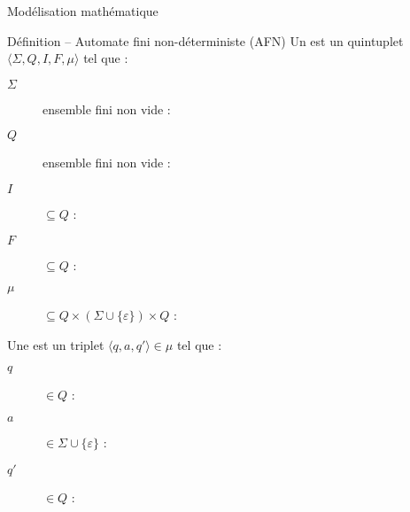 
\begingroup

\begin{frame}{Modélisation mathématique}
  \vspace{-4mm}
  \begin{block}{Définition -- Automate fini non-déterministe (AFN)}
    \vspace{3mm}
    Un  est un quintuplet \alert{$\langle \Sigma, Q, I, F, \mu \rangle$} tel que :
    \begin{description}
    \item[\alert{$\Sigma$}] ensemble fini non vide : 
    \item[\alert{$Q$}] ensemble fini non vide : 
    \item[\alert{$I$}] $\subseteq Q$ : 
    \item[\alert{$F$}] $\subseteq Q$ : 
    \item[\alert{$\mu$}] $\subseteq  Q \times (\Sigma \cup \{\varepsilon\}) \times Q$ : 
    \end{description}

    \vspace{3mm}
    Une  est un triplet \alert{$\langle q, a, q' \rangle \in \mu$} tel que :
    \begin{description}
    \item[\alert{$q$}] $\in Q$ : 
    \item[\alert{$a$}] $\in \Sigma \cup \{\varepsilon\}$ : 
    \item[\alert{$q'$}] $\in Q$ : 
    \end{description}
  \end{block}

  \vspace{-1.3cm}\hspace{7cm}  
\end{frame}

\endgroup
